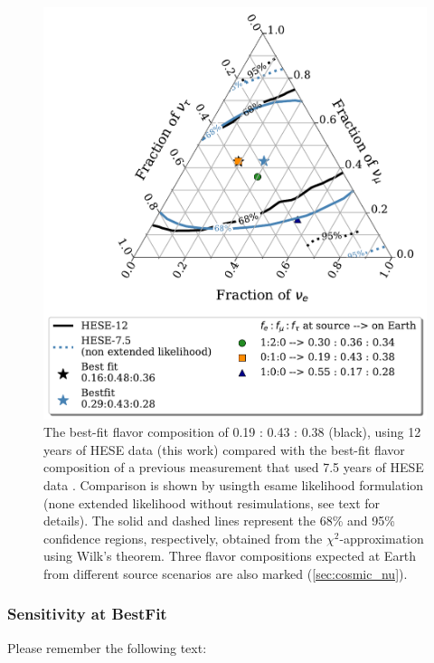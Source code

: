 \begin{figure}[h!]
    \caption{The best-fit flavor composition of 0.19 : 0.43 : 0.38 (black), using 12 years of HESE data (this work) compared with the best-fit flavor composition of a previous measurement that used 7.5 years of HESE data \cite{Juliana_paper}. Comparison is shown by usingth esame likelihood formulation (none extended likelihood without resimulations, see text for details). The solid and dashed lines represent the 68\% and 95\% confidence regions, respectively, obtained from the $\chi^2$-approximation using Wilk's theorem. Three flavor compositions expected at Earth from different source scenarios are also marked (\ref{sec:cosmic_nu}).}
    \includegraphics{./figures/results/HESE7and12_nonextendedonly.pdf}


    
\end{figure}


\subsubsection{Sensitivity at BestFit}
\label{sec:sens_bf}
Please remember the following text:

